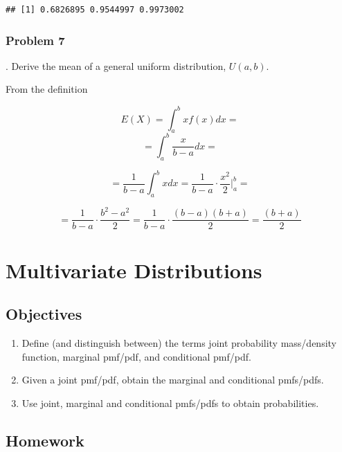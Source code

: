 \documentclass[
]{book}
\providecommand{\tightlist}{%
  \setlength{\itemsep}{0pt}\setlength{\parskip}{0pt}}
\begin{document}
\begin{verbatim}
## [1] 0.6826895 0.9544997 0.9973002
\end{verbatim}

\hypertarget{problem-7-1}{%
\subsection{Problem 7}\label{problem-7-1}}

. Derive the mean of a general uniform distribution, \(U(a,b)\).

From the definition

\[E(X)=\int_{a}^{b}xf(x)dx=\]
\[ =\int_{a}^{b}\frac{x}{b-a}dx =\]

\[ =\frac{1}{b-a}\int_{a}^{b}xdx = \frac{1}{b-a}\cdot\frac{x^2}{2}\bigg|_{a}^{b}=\]

\[ =\frac{1}{b-a}\cdot\frac{b^2-a^2}{2}= \frac{1}{b-a}\cdot\frac{(b-a)(b+a)}{2}=\frac{(b+a)}{2}\]

\hypertarget{MULTIDISTS}{%
\chapter{Multivariate Distributions}\label{MULTIDISTS}}

\newcommand{\E}{\mbox{E}}
\newcommand{\Var}{\mbox{Var}}
\newcommand{\Cov}{\mbox{Cov}}
\newcommand{\Prob}{\mbox{P}}
\newcommand{\diff}{\,\mathrm{d}}

\hypertarget{objectives-13}{%
\section{Objectives}\label{objectives-13}}

\begin{enumerate}
\def\labelenumi{\arabic{enumi})}
\tightlist
\item
  Define (and distinguish between) the terms joint probability mass/density function, marginal pmf/pdf, and conditional pmf/pdf.\\
\item
  Given a joint pmf/pdf, obtain the marginal and conditional pmfs/pdfs.\\
\item
  Use joint, marginal and conditional pmfs/pdfs to obtain probabilities.
\end{enumerate}

\hypertarget{homework-13}{%
\section{Homework}\label{homework-13}}
\end{document}
